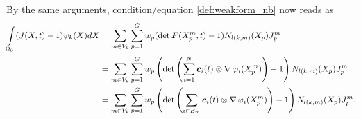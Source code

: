 By the same arguments, condition/equation \eqref{def:weakform_nb} now reads as
\begin{align*}
	\int\limits_{\Omega_0}^{} (J(X,t)-1)\psi_k(X)dX &= \sum\limits_{m\in V_k}^{}\sum\limits_{p=1}^{G} w_p (\det\boldsymbol{F}(X^m_p,t)-1) N_{l(k,m)}(X_p)J^m_p\\
	&= \sum\limits_{m\in V_k}^{}\sum\limits_{p=1}^{G} w_p \left(\det\left(\sum\limits_{i=1}^{N} \boldsymbol{c}_i(t)\otimes \operatorname{\nabla}\varphi_i(X^m_p)\right)-1\right) N_{l(k,m)}(X_p)J^m_p\\
	&= \sum\limits_{m\in V_k}^{}\sum\limits_{p=1}^{G} w_p \left(\det\left(\sum_{i\in E_m} \boldsymbol{c}_i(t)\otimes \operatorname{\nabla}\varphi_i(X^m_p)\right)-1\right) N_{l(k,m)}(X_p)J^m_p.\\
\end{align*}
